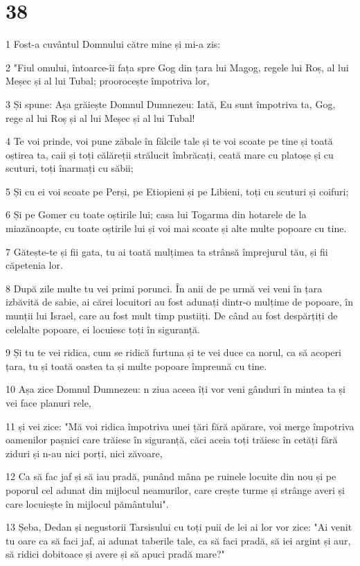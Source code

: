 \chapter{38}

\par 1 Fost-a cuvântul Domnului către mine și mi-a zis:
\par 2 "Fiul omului, întoarce-îi fața spre Gog din țara lui Magog, regele lui Roș, al lui Meșec și al lui Tubal; proorocește împotriva lor,
\par 3 Și spune: Așa grăiește Domnul Dumnezeu: Iată, Eu sunt împotriva ta, Gog, rege al lui Roș și al lui Meșec și al lui Tubal!
\par 4 Te voi prinde, voi pune zăbale în fălcile tale și te voi scoate pe tine și toată oștirea ta, caii și toți călăreții strălucit îmbrăcați, ceată mare cu platoșe și cu scuturi, toți înarmați cu săbii;
\par 5 Și cu ei voi scoate pe Perși, pe Etiopieni și pe Libieni, toți cu scuturi și coifuri;
\par 6 Și pe Gomer cu toate oștirile lui; casa lui Togarma din hotarele de la miazănoapte, cu toate oștirile lui și voi mai scoate și alte multe popoare cu tine.
\par 7 Gătește-te și fii gata, tu ai toată mulțimea ta strânsă împrejurul tău, și fii căpetenia lor.
\par 8 După zile multe tu vei primi porunci. În anii de pe urmă vei veni în țara izbăvită de sabie, ai cărei locuitori au fost adunați dintr-o mulțime de popoare, în munții lui Israel, care au fost mult timp pustiiți. De când au fost despărțiți de celelalte popoare, ei locuiesc toți în siguranță.
\par 9 Și tu te vei ridica, cum se ridică furtuna și te vei duce ca norul, ca să acoperi țara, tu și toată oastea ta și multe popoare împreună cu tine.
\par 10 Așa zice Domnul Dumnezeu: n ziua aceea îți vor veni gânduri în mintea ta și vei face planuri rele,
\par 11 și vei zice: "Mă voi ridica împotriva unei țări fără apărare, voi merge împotriva oamenilor pașnici care trăiesc în siguranță, căci aceia toți trăiesc în cetăți fără ziduri și n-au nici porți, nici zăvoare,
\par 12 Ca să fac jaf și să iau pradă, punând mâna pe ruinele locuite din nou și pe poporul cel adunat din mijlocul neamurilor, care crește turme și strânge averi și care locuiește în mijlocul pământului".
\par 13 Șeba, Dedan și negustorii Tarsisului cu toți puii de lei ai lor vor zice: "Ai venit tu oare ca să faci jaf, ai adunat taberile tale, ca să faci pradă, să iei argint și aur, să ridici dobitoace și avere și să apuci pradă mare?"
